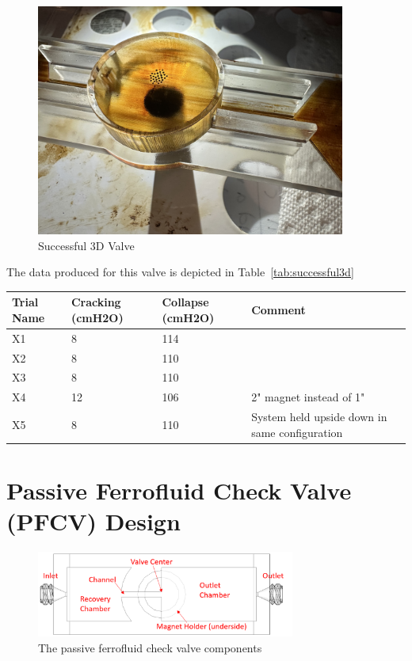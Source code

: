 \documentclass{asme2ej}
\begin{document}
\begin{figure}[h]
\centerline{\includegraphics[width=4in,angle=180]{figure/3DDesignCheckValve.jpeg}}
\caption{Successful 3D Valve}
\label{fig:successful}
\end{figure}

The data produced for this valve is depicted in Table~\ref{tab:successful3d}

\begin{table}[]
  \label{fig:successful3d}
  \begin{tabular}{l|l|l|l}
    \hline
    Trial Name & Cracking (cmH2O) & Collapse (cmH2O) &	Comment \\
    \hline
    \hline
     X1 & 8 & 114 &   \\
    \hline
     X2 & 8 & 110  &    \\
    \hline
     X3 & 8 & 110 &    \\
    \hline
     X4 & 12 & 106 & 2" magnet instead of 1"  \\
    \hline
     X5 & 8 & 110 &  System held upside down in same configuration \\
    \hline
\end{tabular}
\end{table}


\section{Passive Ferrofluid Check Valve (PFCV) Design}
\begin{figure}
\centerline{\includegraphics[width=3.34in]{figure/Figure1.png}}
\caption{The passive ferrofluid check valve components}
\label{fig_components}
\end{figure}
\end{document}
